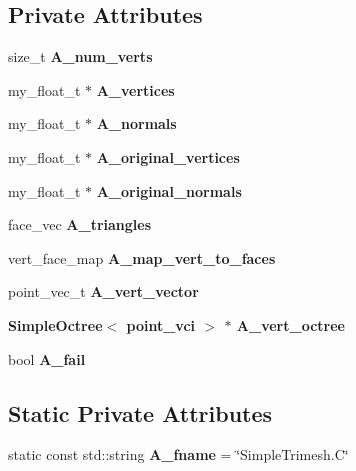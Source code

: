 \subsection*{Private Attributes}
\begin{CompactItemize}
\item 
size\_\-t \textbf{A\_\-num\_\-verts}\label{classASCbase_1_1SimpleTrimesh_6a22833ec49ae22b4bcae565ab506ee7}

\item 
my\_\-float\_\-t $\ast$ \textbf{A\_\-vertices}\label{classASCbase_1_1SimpleTrimesh_0b2728defec0b9891a7d0994e18409a5}

\item 
my\_\-float\_\-t $\ast$ \textbf{A\_\-normals}\label{classASCbase_1_1SimpleTrimesh_ad00478d9a636db9bfebaaa231af324a}

\item 
my\_\-float\_\-t $\ast$ \textbf{A\_\-original\_\-vertices}\label{classASCbase_1_1SimpleTrimesh_f6d1e2ff40b5128807071b875f9ed5a3}

\item 
my\_\-float\_\-t $\ast$ \textbf{A\_\-original\_\-normals}\label{classASCbase_1_1SimpleTrimesh_8b4de78334d1f9d9000736d1a4dd136b}

\item 
face\_\-vec \textbf{A\_\-triangles}\label{classASCbase_1_1SimpleTrimesh_5c348cc0d69688bc23fabb76b264761f}

\item 
vert\_\-face\_\-map \textbf{A\_\-map\_\-vert\_\-to\_\-faces}\label{classASCbase_1_1SimpleTrimesh_a32acc842c22b1302bde419ff1d5eb5a}

\item 
point\_\-vec\_\-t \textbf{A\_\-vert\_\-vector}\label{classASCbase_1_1SimpleTrimesh_26be812cfc1a68392a84acff308cb0d1}

\item 
\bf{Simple\-Octree}$<$ point\_\-vci $>$ $\ast$ \textbf{A\_\-vert\_\-octree}\label{classASCbase_1_1SimpleTrimesh_00784171656f6854854ac59e66946560}

\item 
bool \textbf{A\_\-fail}\label{classASCbase_1_1SimpleTrimesh_06ae2ea910eb94d50838f28e88b39949}

\end{CompactItemize}
\subsection*{Static Private Attributes}
\begin{CompactItemize}
\item 
static const std::string \textbf{A\_\-fname} = \char`\"{}Simple\-Trimesh.C\char`\"{}\label{classASCbase_1_1SimpleTrimesh_280c7e3491eb35295f8f5bd38e2213d5}

\end{CompactItemize}
